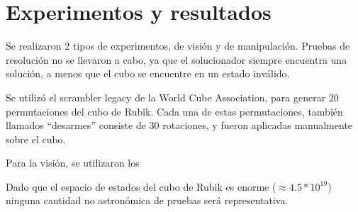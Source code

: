 \chapter{Experimentos y resultados}

Se realizaron 2 tipos de experimentos, de visión y de manipulación. Pruebas de resolución no se llevaron a cabo, ya que el solucionador siempre encuentra una solución, a menos que el cubo se encuentre en un estado inválido.

Se utilizó el scrambler legacy de la World Cube Association, para generar 20 permutaciones del cubo de Rubik. Cada una de estas permutaciones, también llamados ``desarmes'' consiste de 30 rotaciones, y fueron aplicadas manualmente sobre el cubo.

Para la visión, se utilizaron los




Dado que el espacio de estados del cubo de Rubik es enorme ($\approx 4.5*10^{19}$) ninguna cantidad no astronómica de pruebas será representativa.
